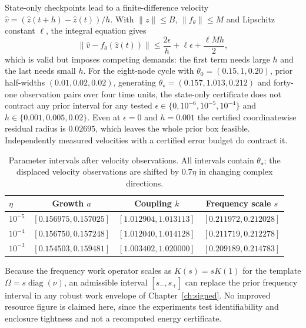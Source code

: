\documentclass[11pt,notitlepage]{report}
\theoremstyle{definition}
\theoremstyle{remark}
\begin{document}
State-only checkpoints lead to a finite-difference velocity $\hat v=(\hat z(t+h)-\hat z(t))/h$. With $\|z\|\le B$, $\|f_\theta\|\le M$ and Lipschitz constant $\ell$, the integral equation gives
\begin{equation}\label{eq:fd}
\|\hat v-f_\theta(\hat z(t))\|\le\frac{2\epsilon}h+\ell\epsilon+\frac{\ell Mh}2,
\end{equation}
which is valid but imposes competing demands: the first term needs large $h$ and the last needs small $h$. For the eight-node cycle with $\theta_0=(0.15,1,0.20)$, prior half-widths $(0.01,0.02,0.02)$, generating $\theta_\star=(0.157,1.013,0.212)$ and forty-one observation pairs over four time units, the state-only certificate does not contract any prior interval for any tested $\epsilon\in\{0,10^{-6},10^{-5},10^{-4}\}$ and $h\in\{0.001,0.005,0.02\}$. Even at $\epsilon=0$ and $h=0.001$ the certified coordinatewise residual radius is $0.02695$, which leaves the whole prior box feasible. Independently measured velocities with a certified error budget do contract it.
\begin{table}[ht]\centering\small
\caption{Parameter intervals after velocity observations. All intervals contain $\theta_\star$; the displaced velocity observations are shifted by $0.7\eta$ in changing complex directions.}
\begin{tabular}{@{}lccc@{}}\toprule
$\eta$&Growth $a$&Coupling $k$&Frequency scale $s$\\\midrule
$10^{-5}$&$[0.156975,0.157025]$&$[1.012904,1.013113]$&$[0.211972,0.212028]$\\
$10^{-4}$&$[0.156750,0.157248]$&$[1.012040,1.014128]$&$[0.211719,0.212278]$\\
$10^{-3}$&$[0.154503,0.159481]$&$[1.003402,1.020000]$&$[0.209189,0.214783]$\\\bottomrule
\end{tabular}
\end{table}
Because the frequency work operator scales as $K(s)=sK(1)$ for the template $\Omega=s\operatorname{diag}(\nu)$, an admissible interval $[s_-,s_+]$ can replace the prior frequency interval in any robust work envelope of Chapter~\ref{ch:signed}. No improved resource figure is claimed here, since the experiments test identifiability and enclosure tightness and not a recomputed energy certificate.
\end{document}
